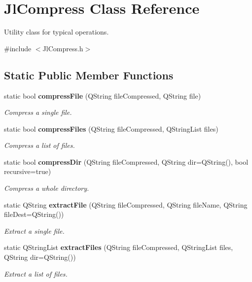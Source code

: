 \section{\-Jl\-Compress \-Class \-Reference}
\label{classJlCompress}


\-Utility class for typical operations.  




{\ttfamily \#include $<$\-Jl\-Compress.\-h$>$}

\subsection*{\-Static \-Public \-Member \-Functions}
\begin{DoxyCompactItemize}
\item 
static bool {\bf compress\-File} (\-Q\-String file\-Compressed, \-Q\-String file)
\begin{DoxyCompactList}\small\item\em \-Compress a single file. \end{DoxyCompactList}\item 
static bool {\bf compress\-Files} (\-Q\-String file\-Compressed, \-Q\-String\-List files)
\begin{DoxyCompactList}\small\item\em \-Compress a list of files. \end{DoxyCompactList}\item 
static bool {\bf compress\-Dir} (\-Q\-String file\-Compressed, \-Q\-String dir=\-Q\-String(), bool recursive=true)
\begin{DoxyCompactList}\small\item\em \-Compress a whole directory. \end{DoxyCompactList}\item 
static \-Q\-String {\bf extract\-File} (\-Q\-String file\-Compressed, \-Q\-String file\-Name, \-Q\-String file\-Dest=\-Q\-String())
\begin{DoxyCompactList}\small\item\em \-Extract a single file. \end{DoxyCompactList}\item 
static \-Q\-String\-List {\bf extract\-Files} (\-Q\-String file\-Compressed, \-Q\-String\-List files, \-Q\-String dir=\-Q\-String())
\begin{DoxyCompactList}\small\item\em \-Extract a list of files. \end{DoxyCompactList}\item 

\end{DoxyCompactItemize}

